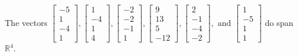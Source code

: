 \begin{exercise}
\begin{exerciseStatement}
  \end{exerciseStatement}
  \begin{exerciseAnswer}
   The vectors \(\left[\begin{array}{r}
-5 \\
1 \\
-4 \\
1
\end{array}\right] , \left[\begin{array}{r}
1 \\
-4 \\
1 \\
4
\end{array}\right] , \left[\begin{array}{r}
-2 \\
-2 \\
-1 \\
1
\end{array}\right] , \left[\begin{array}{r}
9 \\
13 \\
5 \\
-12
\end{array}\right] , \left[\begin{array}{r}
2 \\
-1 \\
-4 \\
-2
\end{array}\right] , \text{ and } \left[\begin{array}{r}
1 \\
-5 \\
1 \\
1
\end{array}\right]\) 
  	 do  
	span \(\mathbb{R}^4\).
  


  \end{exerciseAnswer}
\end{exercise}